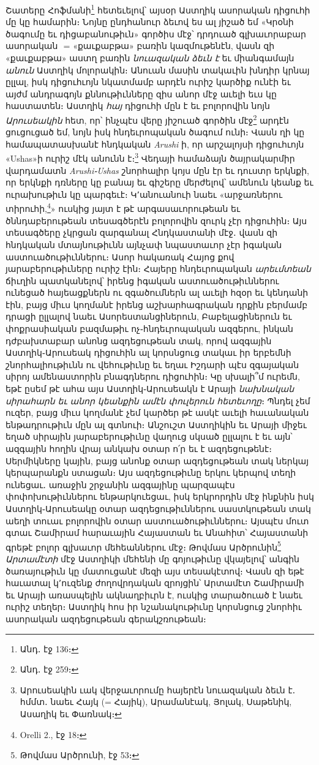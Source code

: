 \documentclass{article}
\newcommand*\svgAAAB{}
\begin{document}
{Շատերը Հոֆմանի\footnote{Անդ․ էջ 136։} հետեւելով՝ այսօր Աստղիկ ասորական դիցուհի մը կը համարին։ Նոյնը ընդհանուր ձեւով ես ալ յիշած եմ «Կրօնի ծագումը եւ դիցաբանութիւն» գործիս մէջ՝ դրդուած գլխաւորաբար ասորական $\svgAAAB$ = «քաւքաբթա» բառին կազմութենէն, վասն զի «քաւքաբթա» աստղ բառին \emph{նուազական ձեւն է} եւ միանգամայն \emph{անուն} Աստղիկ մոլորակին։ Անուան մասին տակաւին խնդիր կրնայ ըլլալ, իսկ դիցուհւոյն նկատմամբ արդէն ուրիշ կարծիք ունէի եւ այժմ անդրագոյն քննութիւնները զիս անոր մէջ աւելի եւս կը հաստատեն։ Աստղիկ \emph{հայ} դիցուհի մըն է եւ բոլորովին նոյն \emph{Արուսեակին} հետ, որ՝ ինչպէս վերը յիշուած գործին մէջ\footnote{Անդ․ էջ 259։} արդէն ցուցուցած եմ, նոյն իսկ հնդեւրոպական ծագում ունի։ Վասն ղի կը համապատասխանէ հնդկական \emph{Arushi} ի, որ արշալոյսի դիցուհւոյն «Ushas»ի ուրիշ մէկ անունն է։\footnote{Արուսեակին ւակ վերջաւորումը հայերէն նուազական ձեւն է․ հմմտ․ նաեւ Հայկ (= Հայիկ), Արամանէակ, Յոլակ, Սաթենիկ, Ասաղիկ եւ Փառնակ։} Վեդայի համաձայն ծայրակարմիր վարդամատն \emph{Arushi֊Ushas} շնորհալիր կոյս մըն էր եւ դուստր երկնքի, որ երկնքի դռները կը բանայ եւ գիշերը մերժելով՝ ամենուն կեանք եւ ուրախութիւն կը պարգեւէ։ Կ՚անուանուի նաեւ «արջառներու տիրուհի,\footnote{Orelli 2., էջ 18։}» ուսկից յայտ է թէ արգասաւորութեան եւ ծննդաբերութեան տեսագծերէն բոլորովին զուրկ չէր դիցուհին։ Այս տեսագծերը չկրցան զարգանալ Հնդկաստանի մէջ․ վասն զի հնդկական մտայնութիւնն այնչափ նպաստաւոր չէր իգական աստուածութիւններու։ Ասոր հակառակ Հայոց քով յարաբերութիւները ուրիշ էին։ Հայերը հնդեւրոպական \emph{արեւմտեան} ճիւղին պատկանելով՝ իրենց իգական աստուածութիւններու ունեցած հայեացքներն ու զգածումներն ալ աւելի հզօր եւ կենդանի էին, բայց միւս կողմանէ իրենց աշխարհագրական դրքին բերմամբ դրացի ըլլալով նաեւ Ասորեստանցիներուն, Բաբելացիներուն եւ փոքրասիական բազմաթիւ ոչ֊հնդեւրոպական ազգերու, ինկան դժբախտաբար անոնց ազդեցութեան տակ, որով ազգային Աստղիկ֊Արուսեակ դիցուհին ալ կորսնցուց տակաւ իր երբեմնի շնորհալիութիւնն ու վեհութիւնը եւ եղաւ Իշդարի պէս զգայական սիրոյ ամենաստորին բնագդներու դիցուհին։ Կը սխալի՞մ ուրեմն, եթէ ըսեմ թէ ահա այս Աստղիկ֊Արուսեակն է Արայի \emph{նախնական սիրահարն եւ անոր կեանքին ամէն փուլերուն հետեւողը}։ Պնդել չեմ ուզեր, բայց միւս կողմանէ չեմ կարծեր թէ ասկէ աւելի հաւանական ենթադրութիւն մըն ալ գտնուի։ Անշուշտ Աստղիկին եւ Արայի միջեւ եղած սիրային յարաբերութիւնը վաղուց սկսած ըլլալու է եւ այն՝ ազգային հողին վրայ անկախ օտար ո՛ր եւ է ազդեցութենէ։ Սերմիկները կային, բայց անոնք օտար ազդեցութեան տակ ներկայ կերպարանքն ստացան։ Այս ազդեցութիւնը երկու կերպով տեղի ունեցաւ․ առաջին շրջանին ազգայինը պարզապէս փոփոխութիւններու ենթարկուեցաւ, իսկ երկրորդին մէջ ինքնին իսկ Աստղիկ֊Արուսեակը օտար ազդեցութիւններու սաստկութեան տակ աեղի տուաւ բոլորովին օտար աստուածութիւններու։ Այսպէս մուտ գտաւ Շամիրամ հարաւային Հայաստան եւ Անահիտ՝ Հայաստանի գրեթէ բոլոր գլխաւոր մեհեաններու մէջ։ Թովմաս Արծրունին\footnote{Թովմաս Արծրունի, էջ 53։} \emph{Արտամէտի} մէջ Աստղիկի մեհենի մը գոյութիւնը վկայելով՝ անգին ծառայութիւն կը մատուցանէ մեզի այս տեսակէտով։ Վասն զի եթէ հաւատալ կ՚ուզենք ժողովրդական զրոյցին՝ Արտամէտ Շամիրամի եւ Արայի առասպելին ակնաղբիւրն է, ուսկից տարածուած է նաեւ ուրիշ տեղեր։ Աստղիկ հոս իր նշանակութիւնը կորսնցուց շնորհիւ ասորական ազդեցութեան գերակշռութեան։

}
\end{document}
